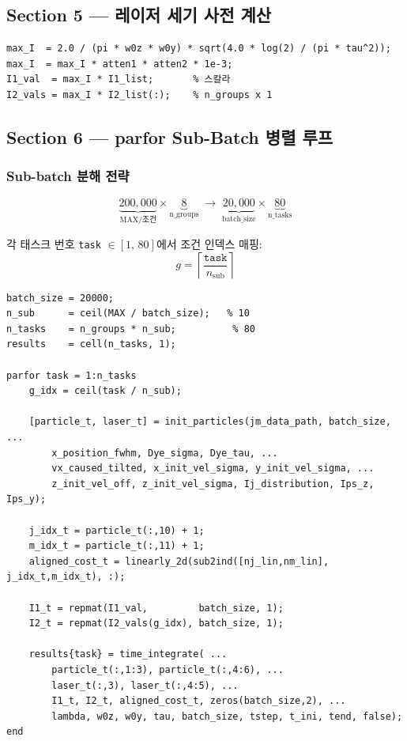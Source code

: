 \documentclass[11pt, a4paper]{article}
\begin{document}
\subsection{Section 5 — 레이저 세기 사전 계산}

\begin{lstlisting}
max_I  = 2.0 / (pi * w0z * w0y) * sqrt(4.0 * log(2) / (pi * tau^2));
max_I  = max_I * atten1 * atten2 * 1e-3;
I1_val  = max_I * I1_list;       % 스칼라
I2_vals = max_I * I2_list(:);    % n_groups x 1
\end{lstlisting}

\subsection{Section 6 — parfor Sub-Batch 병렬 루프}

\subsubsection{Sub-batch 분해 전략}

\[
  \underbrace{200{,}000}_{\text{MAX/조건}} \times \underbrace{8}_{\text{n\_groups}}
  \;\longrightarrow\;
  \underbrace{20{,}000}_{\text{batch\_size}} \times \underbrace{80}_{\text{n\_tasks}}
\]

각 태스크 번호 \texttt{task} $\in [1,\,80]$에서 조건 인덱스 매핑:
\[
  g = \left\lceil \frac{\texttt{task}}{n_\text{sub}} \right\rceil
\]

\begin{lstlisting}
batch_size = 20000;
n_sub      = ceil(MAX / batch_size);   % 10
n_tasks    = n_groups * n_sub;          % 80
results    = cell(n_tasks, 1);

parfor task = 1:n_tasks
    g_idx = ceil(task / n_sub);

    [particle_t, laser_t] = init_particles(jm_data_path, batch_size, ...
        x_position_fwhm, Dye_sigma, Dye_tau, ...
        vx_caused_tilted, x_init_vel_sigma, y_init_vel_sigma, ...
        z_init_vel_off, z_init_vel_sigma, Ij_distribution, Ips_z, Ips_y);

    j_idx_t = particle_t(:,10) + 1;
    m_idx_t = particle_t(:,11) + 1;
    aligned_cost_t = linearly_2d(sub2ind([nj_lin,nm_lin], j_idx_t,m_idx_t), :);

    I1_t = repmat(I1_val,         batch_size, 1);
    I2_t = repmat(I2_vals(g_idx), batch_size, 1);

    results{task} = time_integrate( ...
        particle_t(:,1:3), particle_t(:,4:6), ...
        laser_t(:,3), laser_t(:,4:5), ...
        I1_t, I2_t, aligned_cost_t, zeros(batch_size,2), ...
        lambda, w0z, w0y, tau, batch_size, tstep, t_ini, tend, false);
end
\end{lstlisting}
\end{document}
